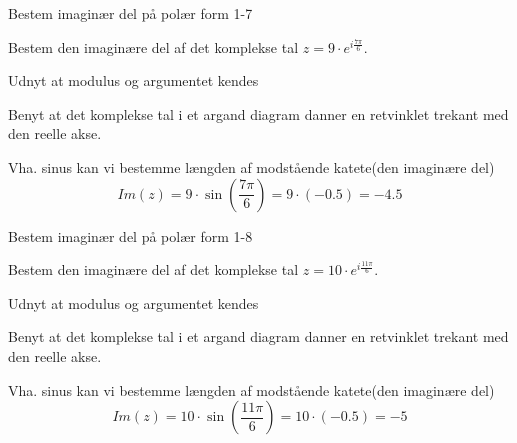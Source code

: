 \documentclass{article}
\begin{document}
\newpage

\begin{exercise}{Bestem imaginær del på polær form 1-7}
	
	Bestem den imaginære del af det komplekse tal $z=9 \cdot e^{i \frac{7 \pi}{6}}$.
	
	
	
	\hint 
	
	Udnyt at modulus og argumentet kendes
	
	
	\hint
	
	Benyt at det komplekse tal i et argand diagram danner en retvinklet trekant med den reelle akse. 
	
	\hint 
	
	Vha. sinus kan vi bestemme længden af modstående katete(den imaginære del)
	\[
	Im(z) =  9 \cdot \sin\left(\frac{7 \pi}{6}\right) = 9 \cdot (-0.5) = -4.5
	\]
	
\end{exercise}

\newpage

\begin{exercise}{Bestem imaginær del på polær form 1-8}
	
	Bestem den imaginære del af det komplekse tal $z=10 \cdot e^{i \frac{11 \pi}{6}}$.
	
	
	
	\hint 
	
	Udnyt at modulus og argumentet kendes
	
	
	\hint
	
	Benyt at det komplekse tal i et argand diagram danner en retvinklet trekant med den reelle akse. 
	
	\hint 
	
	Vha. sinus kan vi bestemme længden af modstående katete(den imaginære del)
	\[
	Im(z) =  10 \cdot \sin\left(\frac{11 \pi}{6}\right) = 10 \cdot (-0.5)= -5
	\]
	
\end{exercise}
\end{document}
